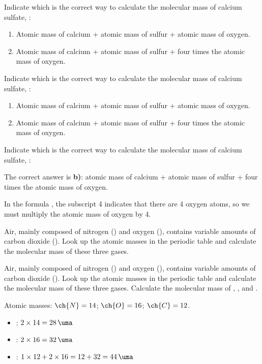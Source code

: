 \begin{exercise}
    Indicate which is the correct way to calculate the molecular mass of calcium sulfate, :
    \begin{enumerate}[label=\letraminuscula]
\item Atomic mass of calcium + atomic mass of sulfur + atomic mass of oxygen.
\item Atomic mass of calcium + atomic mass of sulfur + four times the atomic mass of oxygen.
    \end{enumerate}
    \begin{solu}
        Indicate which is the correct way to calculate the molecular mass of calcium sulfate, :
        \begin{enumerate}[label=\letraminuscula]
\item Atomic mass of calcium + atomic mass of sulfur + atomic mass of oxygen.
\item Atomic mass of calcium + atomic mass of sulfur + four times the atomic mass of oxygen.
        \end{enumerate}
        Indicate which is the correct way to calculate the molecular mass of calcium sulfate, :

        The correct answer is \textbf{b)}: atomic mass of calcium + atomic mass of sulfur + four times the atomic mass of oxygen.

        In the formula , the subscript 4 indicates that there are 4 oxygen atoms, so we must multiply the atomic mass of oxygen by 4.
    \end{solu}
\end{exercise}

\begin{exercise}
    Air, mainly composed of nitrogen () and oxygen (), contains variable amounts of carbon dioxide (). Look up the atomic masses in the periodic table and calculate the molecular mass of these three gases.
    \begin{solu}
        Air, mainly composed of nitrogen () and oxygen (), contains variable amounts of carbon dioxide (). Look up the atomic masses in the periodic table and calculate the molecular mass of these three gases.
        Calculate the molecular mass of , , and .

        Atomic masses: \( \ch{N} = 14 \); \( \ch{O} = 16 \); \( \ch{C} = 12 \).

        \begin{itemize}
            \item {}: \( 2 \times 14 = \qty{28}{\uma} \)
            \item {}: \( 2 \times 16 = \qty{32}{\uma} \)
            \item {}: \( 1 \times 12 + 2 \times 16 = 12 + 32 = \qty{44}{\uma} \)
        \end{itemize}
    \end{solu}
\end{exercise}


